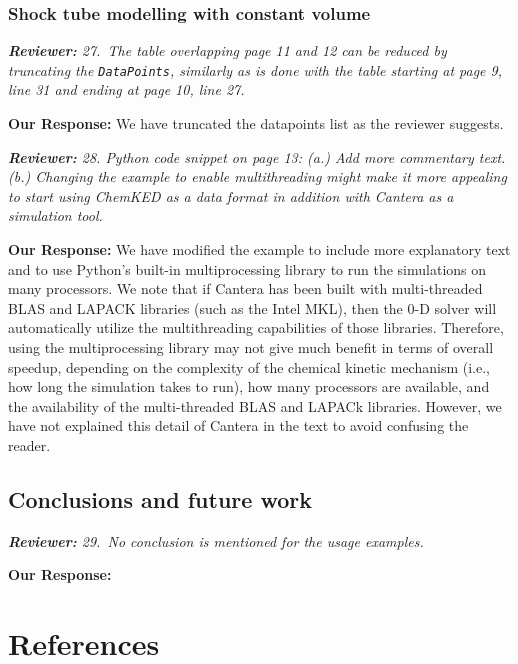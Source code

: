 \documentclass[a4paper,10pt]{elsarticle}
\newenvironment{reviewer}{\vspace{0.5\baselineskip}\begingroup\itshape\textbf{Reviewer:}}{\endgroup}
\newenvironment{response}{\textbf{Our Response:}}{\vspace{0.5\baselineskip}}
\begin{document}
\subsubsection*{Shock tube modelling with constant volume}

\begin{reviewer}
    27.~The table overlapping page 11 and 12 can be reduced by truncating the \texttt{DataPoints},
    similarly as is done with the table starting at page 9, line 31 and ending at page 10, line 27.
\end{reviewer}

\begin{response}
    We have truncated the datapoints list as the reviewer suggests.
\end{response}

\begin{reviewer}
    28. Python code snippet on page 13: (a.) Add more commentary text. (b.) Changing the example to
    enable multithreading might make it more appealing to start using ChemKED as a data format in
    addition with Cantera as a simulation tool.
\end{reviewer}

\begin{response}
    We have modified the example to include more explanatory text and to use Python's built-in
    multiprocessing library to run the simulations on many processors. We note that if Cantera has
    been built with multi-threaded BLAS and LAPACK libraries (such as the Intel MKL), then the 0-D
    solver will automatically utilize the multithreading capabilities of those libraries. Therefore,
    using the multiprocessing library may not give much benefit in terms of overall speedup,
    depending on the complexity of the chemical kinetic mechanism (i.e., how long the simulation
    takes to run), how many processors are available, and the availability of the multi-threaded
    BLAS and LAPACk libraries. However, we have not explained this detail of Cantera in the text to
    avoid confusing the reader.
\end{response}

\subsection*{Conclusions and future work}

\begin{reviewer}
    29.~No conclusion is mentioned for the usage examples.
\end{reviewer}

\begin{response}

\end{response}

\section*{References}


\end{document}
